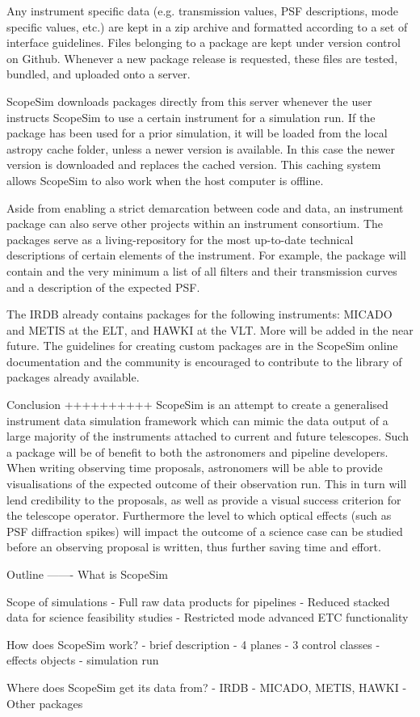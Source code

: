 Any instrument specific data (e.g. transmission values, PSF
descriptions, mode specific values, etc.) are kept in a zip archive and
formatted according to a set of interface guidelines. Files belonging to a
package are kept under version control on Github. Whenever a new package release
is requested, these files are tested, bundled, and uploaded onto a server.

ScopeSim downloads packages directly from this server whenever the user
instructs ScopeSim to use a certain instrument for a simulation run. If the
package has been used for a prior simulation, it will be loaded from the local
astropy cache folder, unless a newer version is available. In this case the
newer version is downloaded and replaces the cached version. This caching system
allows ScopeSim to also work when the host computer is offline.

Aside from enabling a strict demarcation between code and data, an
instrument package can also serve other projects within an instrument
consortium. The packages serve as a living-repository for the most up-to-date
technical descriptions of certain elements of the instrument. For example, the
package will contain and the very minimum a list of all filters and their
transmission curves and a description of the expected PSF.

The IRDB already contains packages for the following instruments: MICADO and
METIS at the ELT, and HAWKI at the VLT. More will be added in the near future.
The guidelines for creating custom packages are in the ScopeSim online
documentation and the community is encouraged to contribute to the library of
packages already available.


Conclusion
++++++++++
ScopeSim is an attempt to create a generalised instrument data simulation
framework which can mimic the data output of a large majority of the instruments
attached to current and future telescopes. Such a package will be of benefit to
both the astronomers and pipeline developers. When writing observing
time proposals, astronomers will be able to provide visualisations of the
expected outcome of their observation run. This in turn will lend credibility
to the proposals, as well as provide a visual success criterion for the
telescope operator. Furthermore the level to which optical effects (such as PSF
diffraction spikes) will impact the outcome of a science case can be studied
before an observing proposal is written, thus further saving time and effort.



Outline
-------
What is ScopeSim

Scope of simulations
- Full raw data products for pipelines
- Reduced stacked data for science feasibility studies
- Restricted mode advanced ETC functionality

How does ScopeSim work?
- brief description
- 4 planes
- 3 control classes
- effects objects
- simulation run

Where does ScopeSim get its data from?
- IRDB
- MICADO, METIS, HAWKI
- Other packages